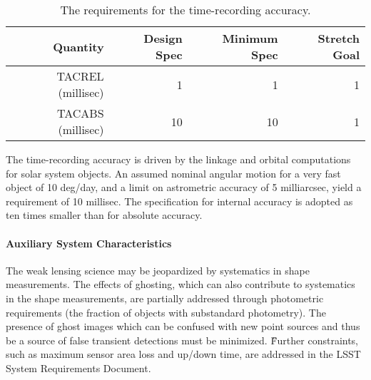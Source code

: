 \begin{table}[h]
\begin{tabular}{|r|r|r|r|}
\hline
Quantity             & Design Spec & Minimum Spec & Stretch Goal     \\
\hline
 TACREL (millisec)   &     1  &    1   &    1 \\
 TACABS (millisec)   &    10  &   10   &    1 \\
\hline
\end{tabular}
\caption{The requirements for the time-recording accuracy.}
\label{TtimeRec}
\end{table}

The time-recording accuracy is driven by the linkage and
orbital computations for solar system objects. An assumed
nominal angular motion for a very fast object of 10 deg/day,
and a limit on astrometric accuracy of 5 milliarcsec, yield
a requirement of 10 millisec. The specification for internal
accuracy is adopted as ten times smaller than for absolute
accuracy.




\paragraph{Auxiliary System Characteristics\\}

The weak lensing science may be jeopardized by systematics in shape
measurements.
The effects of ghosting, which can also contribute to systematics in the
shape measurements, are partially addressed through photometric
requirements (\eg the fraction of objects with substandard photometry).
The presence of ghost images which can be confused with new point sources
and thus be a source of false transient detections must be minimized.
\G{Further constraints, such as maximum sensor area loss and up/down time,
are addressed in the LSST System Requirements Document.}







